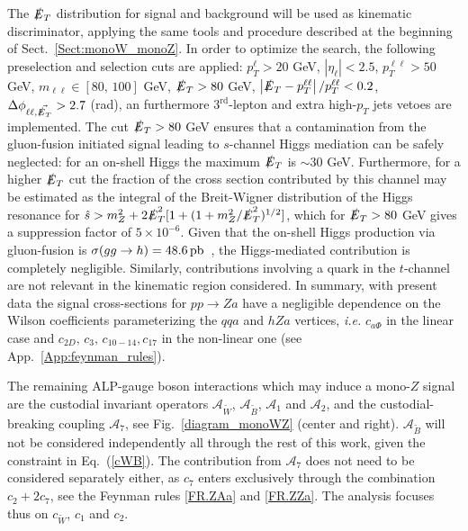 \documentclass[11pt]{article}
\newcommand{\A}{\mathcal{A}}
\newcommand{\Wt}{{\tilde{W}}}
\newcommand{\ETmiss}{\slashed{E}_T}
\renewcommand{\to}{\rightarrow}
\renewcommand{\[}{\begin{equation}}
\renewcommand{\]}{\end{equation}}
\newcounter{diagram}
\begin{document}
The $\ETmiss$ distribution for signal and background will be used as kinematic discriminator, applying the same tools and procedure described at the beginning of 
Sect.~\ref{Sect:monoW_monoZ}. In order to optimize the search, the following preselection and selection cuts are 
applied: $p^{\ell}_T > 20$ GeV, $\left|\eta_\ell\right| < 2.5$, $p^{\ell\ell}_{T} > 50$ GeV, 
$m_{\ell\ell} \in [80,\,100]$ GeV, $\ETmiss > 80$ GeV, $\left|\ETmiss - p_T^{\ell\ell}\right|/p_T^{\ell\ell} < 0.2$, $\Delta \phi_{\ell\ell,\vec{\ETmiss}} > 2.7$ (rad), 
an furthermore $3^{\mathrm{rd}}$-lepton and extra high-$p_T$ jets vetoes are implemented. 
The cut $\ETmiss > 80$ GeV ensures that a contamination from the gluon-fusion initiated 
signal leading to  $s$-channel Higgs mediation can be safely neglected: for an on-shell Higgs the maximum $\ETmiss$ is $\sim 30$ GeV. Furthermore,  for 
a higher $\ETmiss$ cut  the fraction of the cross section contributed by this channel may be estimated as the integral of the 
Breit-Wigner distribution of the Higgs resonance for $\hat{s} > m_Z^2+ 2\ETmiss^2 [1 + (1 + m_Z^2/\ETmiss^2)^{1/2}]$, which for $\ETmiss > 80$ GeV gives a suppression 
factor of $5\times10^{-6}$. Given that the on-shell Higgs production via gluon-fusion is $\sigma(gg \to h) = \unit[48.6]{pb}$~\cite{deFlorian:2016spz},   
the Higgs-mediated contribution  is completely negligible. Similarly, 
contributions involving a quark in the $t$-channel are not relevant in the kinematic region considered.
 In summary, with present data the signal cross-sections for $p p \to Z a$ have a negligible dependence on 
the Wilson coefficients parameterizing the $qqa$ and $hZa$ vertices, {\it i.e.} $c_{a\Phi}$ in the linear case and 
$c_{2D},\,c_3,\,c_{10-14},c_{17}$ in the non-linear one (see App.~\ref{App:feynman_rules}).

The remaining ALP-gauge boson interactions which may induce a mono-$Z$ signal are the custodial invariant operators  $\A_{\tilde{W}}$, $\A_{\tilde{B}}$, 
$\A_1$ and $\A_2$, and the custodial-breaking coupling $\A_7$, see Fig.~\ref{diagram_monoWZ} (center and right). $\A_{\tilde{B}}$ will not be considered 
independently all through the rest of this work, given the constraint in Eq.~(\ref{cWB}). The contribution from $\A_7$  does not need to be considered 
separately either, as $c_7$ enters exclusively through the combination $c_2+ 2c_7$, see the Feynman rules \ref{FR.ZAa} and \ref{FR.ZZa}. The analysis 
focuses thus on $c_{\Wt}$, $c_1$ and $c_2$.  
\end{document}
